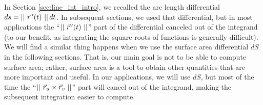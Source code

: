 In Section \ref{sec:line_int_intro}, we recalled the arc length differential $ds=\left|\left|\ \vec r\, '(t)\ \right|\right|dt$. In subsequent sections, we used that differential, but in most applications the ``$\left|\left|\ \vec r\, '(t)\ \right|\right|$'' part of the differential canceled out of the integrand (to our benefit, as integrating the square roots of functions is generally difficult). We will find a similar thing happens when we use the surface area differential $dS$ in the following sections. That is, our main goal is not to be able to compute surface area; rather, surface area is a tool to obtain other quantities that are more important and useful. In our applications, we will use $dS$, but most of the time the ``$\left|\left|\ \vec r_u\times \vec r_v\ \right|\right|$'' part will cancel out of the integrand, making the subsequent integration easier to compute.

